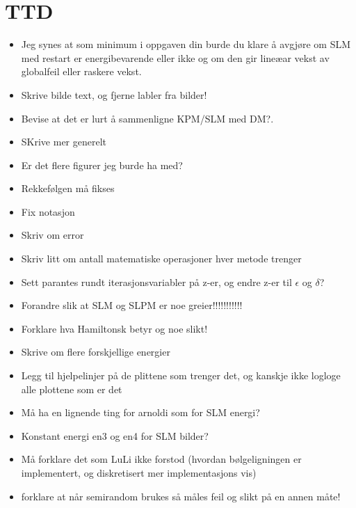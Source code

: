 \chapter{TTD}
\begin{itemize}
\item Jeg synes at som minimum i oppgaven din burde du klare å avgjøre om SLM med restart er energibevarende eller ikke og om den gir lineæar vekst av globalfeil eller raskere vekst.
\item Skrive bilde text, og fjerne labler fra bilder!
\item Bevise at det er lurt å sammenligne KPM/SLM med DM?.
\item SKrive mer generelt
\item Er det flere figurer jeg burde ha med?
\item Rekkefølgen må fikses
\item Fix notasjon
\item Skriv om error
\item Skriv litt om antall matematiske operasjoner hver metode trenger
\item Sett parantes rundt iterasjonsvariabler på z-er, og endre z-er til $\epsilon$ og $\delta$?
\item Forandre slik at SLM og SLPM er noe greier!!!!!!!!!!!
\item Forklare hva Hamiltonsk betyr og noe slikt!
\item Skrive om flere forskjellige energier
\item Legg til hjelpelinjer på de plittene som trenger det, og kanskje ikke logloge alle plottene som er det
\item Må ha en lignende ting for arnoldi som for SLM energi?
\item Konstant energi en3 og en4 for SLM bilder?
\item Må forklare det som LuLi ikke forstod (hvordan bølgeligningen er implementert, og diskretisert mer implementasjons vis)
\item forklare at når semirandom brukes så måles feil og slikt på en annen måte!
\end{itemize}